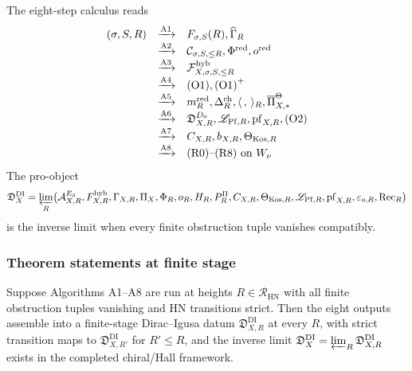 The eight-step calculus reads
\[
\begin{array}{rcl}
(\sigma,S,R) & \xrightarrow{\textrm{A1}} &
F_{\sigma,S}(R),\widehat\Gamma_R\\
& \xrightarrow{\textrm{A2}} &
\mathcal C_{\sigma,S,\le R},\Phi^{\mathrm{red}},o^{\mathrm{red}}\\
& \xrightarrow{\textrm{A3}} &
\mathcal F_{X,\sigma,S,\le R}^{\mathrm{hyb}}\\
& \xrightarrow{\textrm{A4}} &
\textup{(O1)},\textup{(O1)}^+\\
& \xrightarrow{\textrm{A5}} &
m_R^{\mathrm{red}},\Delta_R^{\mathrm{ch}},
\langle\,,\,\rangle_R,\overline\Pi_{X,*}^\Theta\\
& \xrightarrow{\textrm{A6}} &
\mathfrak D_{X,R}^{D_0},\mathscr L_{\mathrm{Pf},R},
\operatorname{pf}_{X,R},\textup{(O2)}\\
& \xrightarrow{\textrm{A7}} &
C_{X,R},b_{X,R},\Theta_{\mathrm{Kos},R}\\
& \xrightarrow{\textrm{A8}} &
\textup{(R0)\text{--}(R8)\ on\ }W_\nu
\end{array}
\]
The pro-object
\[
\mathfrak D_X^{\mathrm{DI}}
=\varprojlim_R\bigl(
\mathcal A_{X,R}^{E_3},
F_{X,R}^{\mathrm{hyb}},
\Gamma_{X,R},
\Pi_X,
\Phi_R,
o_R,
H_R,
P_R^\Pi,
C_{X,R},
\Theta_{\mathrm{Kos},R},
\mathscr L_{\mathrm{Pf},R},
\operatorname{pf}_{X,R},
\varepsilon_{o,R},
\mathrm{Rec}_R\bigr)
\]
is the inverse limit when every finite obstruction tuple vanishes
compatibly.

\subsubsection*{Theorem statements at finite stage}

\begin{theorem}
\label{thm:finite-stage-dirac-igusa-pro-object}
Suppose Algorithms A1--A8 are run at heights
$R\in\mathcal R_{\mathrm{HN}}$ with all finite obstruction tuples
vanishing and HN transitions strict.  Then the eight outputs assemble
into a finite-stage Dirac--Igusa datum
$\mathfrak D_{X,R}^{\mathrm{DI}}$ at every $R$, with strict
transition maps to $\mathfrak D_{X,R'}^{\mathrm{DI}}$ for $R'\le R$,
and the inverse limit $\mathfrak D_X^{\mathrm{DI}}=\varprojlim_R
\mathfrak D_{X,R}^{\mathrm{DI}}$ exists in the completed
chiral/Hall framework.
\end{theorem}

